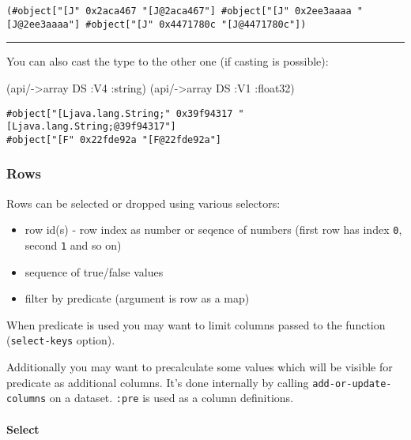 \documentclass[]{article}
\newenvironment{Shaded}{\begin{snugshade}}{\end{snugshade}}
\newcommand{\AttributeTok}[1]{\textcolor[rgb]{0.77,0.63,0.00}{#1}}
\newcommand{\NormalTok}[1]{#1}
\providecommand{\tightlist}{%
  \setlength{\itemsep}{0pt}\setlength{\parskip}{0pt}}
\let\oldparagraph\paragraph
\renewcommand{\paragraph}[1]{\oldparagraph{#1}\mbox{}}
\begin{document}
\begin{verbatim}
(#object["[J" 0x2aca467 "[J@2aca467"] #object["[J" 0x2ee3aaaa "[J@2ee3aaaa"] #object["[J" 0x4471780c "[J@4471780c"])
\end{verbatim}

\begin{center}\rule{0.5\linewidth}{0.5pt}\end{center}

You can also cast the type to the other one (if casting is possible):

\begin{Shaded}
\begin{Highlighting}[]
\NormalTok{(api/->array DS }\AttributeTok{:V4} \AttributeTok{:string}\NormalTok{)}
\NormalTok{(api/->array DS }\AttributeTok{:V1} \AttributeTok{:float32}\NormalTok{)}
\end{Highlighting}
\end{Shaded}

\begin{verbatim}
#object["[Ljava.lang.String;" 0x39f94317 "[Ljava.lang.String;@39f94317"]
#object["[F" 0x22fde92a "[F@22fde92a"]
\end{verbatim}

\subsubsection{Rows}\label{rows}

Rows can be selected or dropped using various selectors:

\begin{itemize}
\tightlist
\item
  row id(s) - row index as number or seqence of numbers (first row has
  index \texttt{0}, second \texttt{1} and so on)
\item
  sequence of true/false values
\item
  filter by predicate (argument is row as a map)
\end{itemize}

When predicate is used you may want to limit columns passed to the
function (\texttt{select-keys} option).

Additionally you may want to precalculate some values which will be
visible for predicate as additional columns. It's done internally by
calling \texttt{add-or-update-columns} on a dataset. \texttt{:pre} is
used as a column definitions.

\paragraph{Select}\label{select-1}
\end{document}
